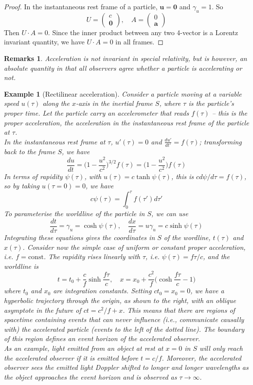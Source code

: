 \documentclass[a4paper]{article}
\newtheorem{remarks}{Remarks}[section]
\newtheorem{eg}{Example}[section]
\theoremstyle{new}
\begin{document}
\begin{proof}
In the instantaneous rest frame of a particle, $\mathbf{u} = \mathbf{0}$ and $\gamma_u = 1$. So
$$U =
  \begin{pmatrix}
    c\\
    \mathbf{0}
  \end{pmatrix}, \quad
  A =
  \begin{pmatrix}
    0\\
    \mathbf{a}
  \end{pmatrix}$$
Then $U\cdot A = 0$. Since the inner product between any two 4-vector is a Lorentz invariant quantity, we have $U\cdot A = 0$ in all frames.
\end{proof}
\begin{remarks}
Acceleration is not invariant in special relativity, but is however, an absolute quantity in that all observers agree whether a particle is accelerating or not.
\end{remarks}
\begin{eg}[Rectilinear acceleration]
Consider a particle moving at a variable speed $u(\tau)$ along the $x$-axis in the inertial frame $S$, where $\tau$ is the particle’s proper time. Let the particle carry an accelerometer that reads $f(\tau)$ – this is the proper acceleration, the acceleration in the instantaneous rest frame of the particle at $\tau$.\\[5pt]
In the instantaneous rest frame at $\tau$, $u'(\tau)=0$ and $\frac{du'}{dt'}=f(\tau)$; transforming back to the frame $S$, we have
$$\frac{du}{dt}=\bigg(1-\frac{u^2}{c^2}\bigg)^{3/2}f(\tau)=\bigg(1-\frac{u^2}{c^2}\bigg)f(\tau)$$
In terms of rapidity $\psi(\tau)$, with $u(\tau)=c\tanh\psi(\tau)$, this is $cd\psi/d\tau=f(\tau)$, so by taking $u(\tau=0)=0$, we have
$$c\psi(\tau)=\int_0^\tau f(\tau')d\tau'$$
To parameterise the worldline of the particle in $S$, we can use
$$\frac{dt}{d\tau}=\gamma_u=\cosh\psi(\tau),\quad\frac{dx}{d\tau}=u\gamma_u=c\sinh\psi(\tau)$$
Integrating these equations gives the coordinates in $S$ of the wordline, $t(\tau)$ and $x(\tau)$. Consider now the simple case of uniform or constant proper acceleration, i.e. $f=\text{const}$. The rapidity rises linearly with $\tau$, i.e. $\psi(\tau)=f\tau/c$, and the worldline is
$$t=t_0+\frac{c}{f}\sinh\frac{f\tau}{c},\quad x=x_0+\frac{c^2}{f}\bigg(\cosh\frac{f\tau}{c}-1\bigg)$$
where $t_0$ and $x_0$ are integration constants. Setting $ct_0=x_0=0$, we have a hyperbolic trajectory through the origin, as shown to the right, with an oblique asymptote in the future of $ct = c^2/f + x$. This means that there are regions of spacetime containing events that can never influence (i.e., communicate causally with) the accelerated particle (events to the left of the dotted line). The boundary of this region defines an event horizon of the accelerated observer.\\[5pt]
As an example, light emitted from an object at rest at $x = 0$ in $S$ will only reach the accelerated observer if it is emitted before $t = c/f$. Moreover, the accelerated observer sees the emitted light Doppler shifted to longer and longer wavelengths as the object approaches the event horizon and is observed as $\tau\rightarrow\infty$.
\end{eg}
\end{document}
